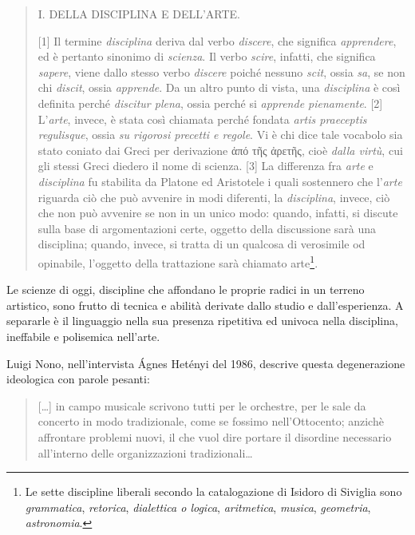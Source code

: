 \documentclass[a4paper,11pt]{article}
\begin{document}
\begin{quotation}
I. DELLA DISCIPLINA E DELL'ARTE.

{[}1{]} Il termine \emph{disciplina} deriva dal verbo \emph{discere}, che
significa \emph{apprendere}, ed è pertanto sinonimo di \emph{scienza}. Il verbo
\emph{scire}, infatti, che significa \emph{sapere}, viene dallo stesso verbo
\emph{discere} poiché nessuno \emph{scit}, ossia \emph{sa}, se non chi \emph{discit},
ossia \emph{apprende}. Da un altro punto di vista, una \emph{disciplina} è così
definita perché \emph{discitur plena}, ossia perché si \emph{apprende
pienamente}. {[}2{]} L'\emph{arte}, invece, è stata così chiamata perché
fondata \emph{artis praeceptis regulisque}, ossia \emph{su rigorosi precetti e
regole}. Vi è chi dice tale vocabolo sia stato coniato dai Greci per
derivazione ἀπό τῆς ἀρετῆς, cioè \emph{dalla virtù}, cui gli stessi Greci
diedero il nome di scienza. {[}3{]} La differenza fra \emph{arte} e
\emph{disciplina} fu stabilita da Platone ed Aristotele i quali sostennero
che l'\emph{arte} riguarda ciò che può avvenire in modi diferenti, la
\emph{disciplina}, invece, ciò che non può avvenire se non in un unico
modo: quando, infatti, si discute sulla base di argomentazioni certe,
oggetto della discussione sarà una disciplina; quando, invece, si
tratta di un qualcosa di verosimile od opinabile, l'oggetto della
trattazione sarà chiamato arte\footnote{Le sette discipline liberali secondo la catalogazione di Isidoro
di Siviglia sono \emph{grammatica}, \emph{retorica}, \emph{dialettica o logica},
\emph{aritmetica}, \emph{musica}, \emph{geometria}, \emph{astronomia}.}.
\end{quotation}

Le scienze di oggi, discipline che affondano le proprie radici in un
terreno artistico, sono frutto di tecnica e abilità derivate dallo
studio e dall'esperienza. A separarle è il linguaggio nella sua presenza
ripetitiva ed univoca nella disciplina, ineffabile e polisemica
nell'arte.

Luigi Nono, nell'intervista Ágnes Hetényi del 1986, descrive questa
degenerazione ideologica con parole pesanti:

\begin{quote}
{[}\ldots{}{]} in campo musicale scrivono tutti per le orchestre, per le sale
da concerto in modo tradizionale, come se fossimo nell'Ottocento;
anzichè affrontare problemi nuovi, il che vuol dire portare il
disordine necessario all'interno delle organizzazioni tradizionali\ldots{}
\end{quote}
\end{document}
